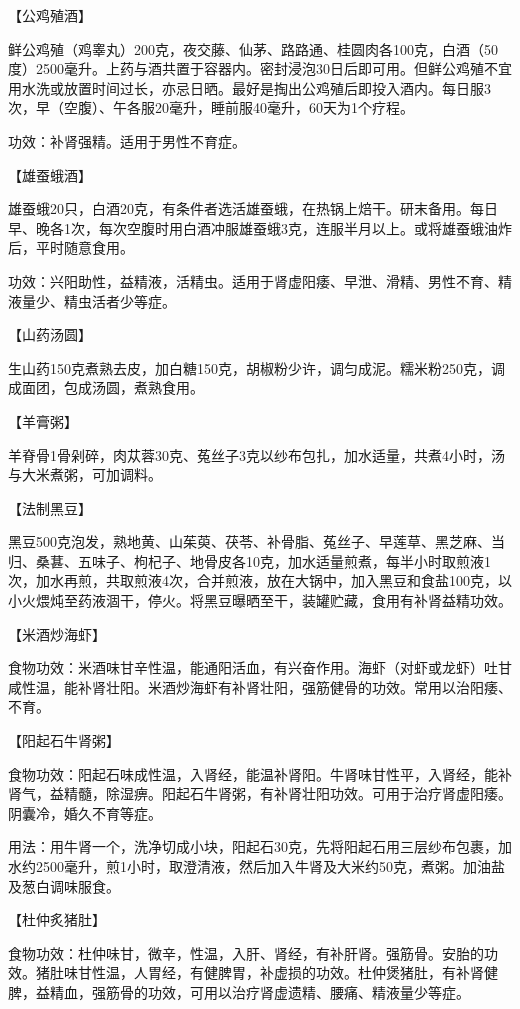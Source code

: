 \documentclass[12pt,UTF8,openany]{ctexbook}
\begin{document}
【公鸡殖酒】

鲜公鸡殖（鸡睾丸）200克，夜交藤、仙茅、路路通、桂圆肉各100克，白酒（50度）2500毫升。上药与酒共置于容器内。密封浸泡30日后即可用。但鲜公鸡殖不宜用水洗或放置时间过长，亦忌日晒。最好是掏出公鸡殖后即投入酒内。每日服3次，早（空腹）、午各服20毫升，睡前服40毫升，60天为1个疗程。

功效：补肾强精。适用于男性不育症。

【雄蚕蛾酒】

雄蚕蛾20只，白酒20克，有条件者选活雄蚕蛾，在热锅上焙干。研末备用。每日早、晚各1次，每次空腹时用白酒冲服雄蚕蛾3克，连服半月以上。或将雄蚕蛾油炸后，平时随意食用。

功效：兴阳助性，益精液，活精虫。适用于肾虚阳痿、早泄、滑精、男性不育、精液量少、精虫活者少等症。

【山药汤圆】

生山药150克煮熟去皮，加白糖150克，胡椒粉少许，调匀成泥。糯米粉250克，调成面团，包成汤圆，煮熟食用。

【羊膏粥】

羊脊骨1骨剁碎，肉苁蓉30克、菟丝子3克以纱布包扎，加水适量，共煮4小时，汤与大米煮粥，可加调料。

【法制黑豆】

黑豆500克泡发，熟地黄、山茱萸、茯苓、补骨脂、菟丝子、早莲草、黑芝麻、当归、桑葚、五味子、枸杞子、地骨皮各10克，加水适量煎煮，每半小时取煎液1次，加水再煎，共取煎液4次，合并煎液，放在大锅中，加入黑豆和食盐100克，以小火煨炖至药液涸干，停火。将黑豆曝晒至干，装罐贮藏，食用有补肾益精功效。

【米酒炒海虾】

食物功效：米酒味甘辛性温，能通阳活血，有兴奋作用。海虾（对虾或龙虾）吐甘咸性温，能补肾壮阳。米酒炒海虾有补肾壮阳，强筋健骨的功效。常用以治阳痿、不育。

【阳起石牛肾粥】

食物功效：阳起石味成性温，入肾经，能温补肾阳。牛肾味甘性平，入肾经，能补肾气，益精髓，除湿痹。阳起石牛肾粥，有补肾壮阳功效。可用于治疗肾虚阳痿。阴囊冷，婚久不育等症。

用法：用牛肾一个，洗净切成小块，阳起石30克，先将阳起石用三层纱布包裹，加水约2500毫升，煎1小时，取澄清液，然后加入牛肾及大米约50克，煮粥。加油盐及葱白调味服食。

【杜仲炙猪肚】

食物功效：杜仲味甘，微辛，性温，入肝、肾经，有补肝肾。强筋骨。安胎的功效。猪肚味甘性温，人胃经，有健脾胃，补虚损的功效。杜仲煲猪肚，有补肾健脾，益精血，强筋骨的功效，可用以治疗肾虚遗精、腰痛、精液量少等症。
\end{document}
